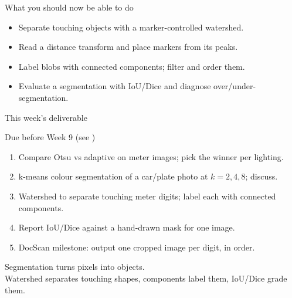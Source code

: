 \documentclass[10pt,aspectratio=169]{beamer}
\begin{document}
\begin{frame}{What you should now be able to do}
  \begin{itemize}
    \item Separate touching objects with a marker-controlled watershed.
    \item Read a distance transform and place markers from its peaks.
    \item Label blobs with connected components; filter and order them.
    \item Evaluate a segmentation with IoU/Dice and diagnose over/under-segmentation.
  \end{itemize}
\end{frame}

\begin{frame}{This week's deliverable}
  \begin{alertblock}{Due before Week 9 (see )}
    \begin{enumerate}
      \item Compare Otsu vs adaptive on meter images; pick the winner per lighting.
      \item k-means colour segmentation of a car/plate photo at $k=2,4,8$; discuss.
      \item Watershed to separate touching meter digits; label each with connected components.
      \item Report IoU/Dice against a hand-drawn mask for one image.
      \item DocScan milestone: output one cropped image per digit, in order.
    \end{enumerate}
  \end{alertblock}
\end{frame}

\begin{frame}[standout]
  Segmentation turns pixels into objects.\\[4pt]
  \normalsize Watershed separates touching shapes, components label them, IoU/Dice grade them.
\end{frame}
\end{document}
